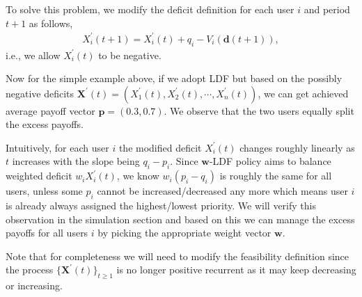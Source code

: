 \documentclass[prodmode,acmtompecs]{acmsmall}
\newcommand{\reqvec}{\mathbf{q}}
\newcommand{\reqscalar}{q}
\newcommand{\myComments}[1]{}
\newif\ifinfocom
\newif\ifextended
\newcommand{\infocomStart}{\ifinfocom \myComments{Infocom: }}
\newcommand{\extendedStart}{\ifextended  \myComments{Extended version: }}
\newcommand{\commentEnd}{\myComments{End}}
\newcommand{\add}[1]{#1}
\begin{document}
To solve this problem, we modify the deficit definition for each user $i$ and period $t+1$ as follows, 
\begin{align}
\label{align_deficit_possibly_negative}
X_i^\prime(t+1) = X_i^\prime(t) + \reqscalar_i - V_i(\mathbf{d}(t+1)), 
\end{align}
i.e., we allow $X_i^\prime(t)$ to be negative. 

Now for the simple example above, if we adopt LDF but based on the possibly negative deficits $\mathbf{X}^\prime(t) = (X_1^\prime(t), X_2^\prime(t), \cdots, X_n^\prime(t))$, we can get achieved average payoff vector $\mathbf{p} = (0.3, 0.7)$. We observe that the two users equally split the excess payoffs. 

Intuitively, for each user $i$ the modified deficit $X_i^\prime(t)$ changes roughly linearly as $t$ increases with the slope being $\reqscalar_i - p_i$. Since $\mathbf{w}$-LDF policy aims to balance weighted deficit $w_iX_i^\prime(t)$, we know $w_i(p_i - \reqscalar_i)$ is roughly the same for all users, unless some $p_i$ cannot be increased/decreased any more which means user $i$ is already always assigned the highest/lowest priority. We will verify this observation in the simulation section and based on this we can manage the excess payoffs for all users $i$ by picking the appropriate weight vector $\mathbf{w}$. 
\commentEnd\fi

\add{
Note that for completeness we will need to modify the feasibility definition since the process $\{\mathbf{X}^\prime(t)\}_{t\geq 1}$ is no longer positive recurrent as it may keep decreasing or increasing. 
\infocomStart
Refer to the extended version of this paper \cite{EXT2} for details. 
\commentEnd\fi
\extendedStart
Now we call a payoff requirement vector $\reqvec$ feasible if, under some user prioritization policy, for each user $i$ the time-averaged payoff per period is at least $\reqscalar_i$. Formally, recall that $V_i(\mathbf{d}(t))$ is the random payoff for user $i$ in period $t$. As the payoff requirement, each user $i$ requires that
$$
\liminf_{\tau \rightarrow \infty} \frac{1}{\tau}\sum\limits_{t = 1}^{\tau} V_i(\mathbf{d}(t)) \geq q_i, \text{with probability 1}.
$$
Note that this definition and Definition \ref{defn_feasibility_pr} are just two ways to define the feasibility. With the theorem in \cite{Bla56} we can show that for any user prioritization policy, the sets of feasible QoS requirements under these two different feasibility definitions differ by at most a boundary and thus are equivalent for practical purposes. Therefore, all the results we discuss in this paper hold under both feasibility definitions. 
\commentEnd\fi
}
\end{document}

